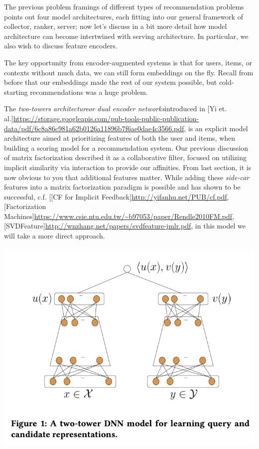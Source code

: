 The previous problem framings of different types of recommendation problems points out four model architectures, each fitting into our general framework of collector, ranker, server; now let's discuss in a bit more detail how model architecture can become intertwined with serving architecture. In particular, we also wish to discuss feature encoders. 

The key opportunity from encoder-augmented systems is that for users, items, or contexts without much data, we can still form embeddings on the fly. Recall from before that our embeddings made the rest of our system possible, but cold-starting recommendations was a huge problem.

The \emph{two-towers architecture}\textemdash \emph{or dual encoder networks}\textemdash introduced in [Yi et. al.]\url{https://storage.googleapis.com/pub-tools-public-publication-data/pdf/6c8a86c981a62b0126a11896b7f6ae0dae4c3566.pdf}, is an explicit model architecture aimed at prioritizing features of both the user and items, when building a scoring model for a recommendation system. Our previous discussion of matrix factorization described it as a collaborative filter, focused on utilizing implicit similarity via interaction to provide our affinities. From last section, it is now obvious to you that additional features matter. While adding these \emph{side-car} features into a matrix factorization paradigm is possible and has shown to be successful, c.f. [[CF for Implicit Feedback]\url{http://yifanhu.net/PUB/cf.pdf}, [Factorization Machines]\url{https://www.csie.ntu.edu.tw/~b97053/paper/Rendle2010FM.pdf}, [SVDFeature]\url{http://wnzhang.net/papers/svdfeature-jmlr.pdf}, in this model we will take a more direct approach. 

\includegraphics[width=\textwidth-10pt]{book-text/two-towers-architecture-diagram.png}

